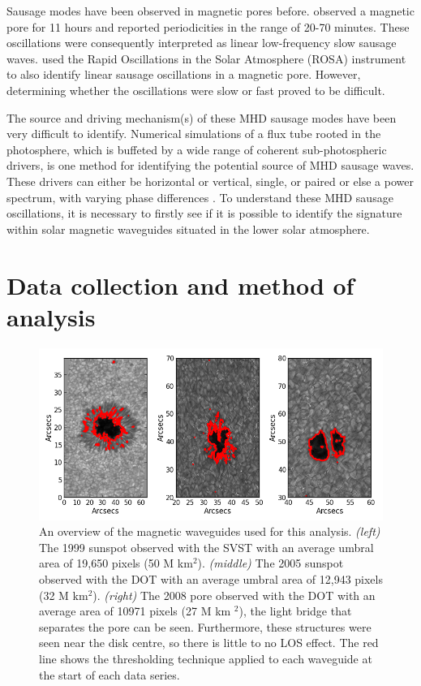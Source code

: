	Sausage modes have been observed in magnetic pores before.
	\citet{doretala2008} observed a magnetic pore for 11 hours and reported periodicities in the range of 20-70 minutes.
	These oscillations were consequently interpreted as linear low-frequency slow sausage waves.
	\citet{morton2011} used the Rapid Oscillations in the Solar Atmosphere (ROSA) instrument to also identify linear sausage oscillations in a magnetic pore.
	However, determining whether the oscillations were slow or fast proved to be difficult.

	The source and driving mechanism(s) of these MHD sausage modes have been very difficult to identify.
	Numerical simulations of a flux tube rooted in the photosphere, which is buffeted by a wide range of coherent sub-photospheric drivers, is one method for identifying the potential source of MHD sausage waves.
	These drivers can either be horizontal or vertical, single, or paired or else a power spectrum, with varying phase differences \citep[see e.g.][]{malins,khomenko,fedun2,fedun1,Vigeesh2012}.
	To understand these MHD sausage oscillations, it is necessary to firstly see if it is possible to identify the signature within solar magnetic waveguides situated in the lower solar atmosphere.
	
\section{Data collection and method of analysis}

	\begin{figure}
        
		\centering
		\includegraphics[width=\textwidth]{overview.png}
		\caption{
		An overview of the magnetic waveguides used for this analysis.
		\textit{(left)} The 1999 sunspot observed with the SVST with an average umbral area of 19,650 pixels (50 M km$^{2}$).
		\textit{(middle)} The 2005 sunspot observed with the DOT with an average umbral area of 12,943 pixels (32 M km$^{2}$).
		\textit{(right)} The 2008 pore observed with the DOT with an average area of 10971 pixels (27 M km $^{2}$), the light bridge that separates the pore can be seen.
		Furthermore, these structures were seen near the disk centre, so there is little to no LOS effect.
		The red line shows the thresholding technique applied to each waveguide at the start of each data series.}
		\label{images}
	\end{figure}

